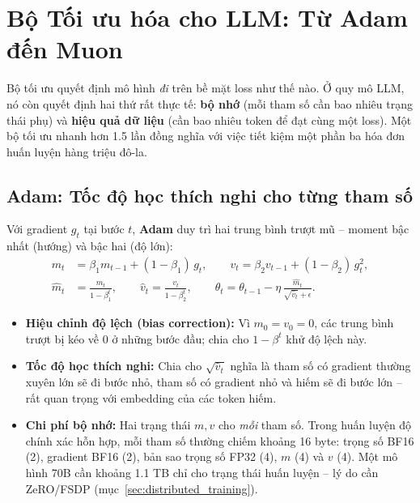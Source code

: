 
\section{Bộ Tối ưu hóa cho LLM: Từ Adam đến Muon \newtag}
\label{sec:llm_optimizers}

Bộ tối ưu quyết định mô hình \emph{đi} trên bề mặt loss như thế nào. Ở quy mô LLM, nó còn quyết định hai thứ rất thực tế: \textbf{bộ nhớ} (mỗi tham số cần bao nhiêu trạng thái phụ) và \textbf{hiệu quả dữ liệu} (cần bao nhiêu token để đạt cùng một loss). Một bộ tối ưu nhanh hơn 1.5 lần đồng nghĩa với việc tiết kiệm một phần ba hóa đơn huấn luyện hàng triệu đô-la.

\subsection{Adam: Tốc độ học thích nghi cho từng tham số}
\label{ssec:adam}
Với gradient $g_t$ tại bước $t$, \textbf{Adam} \cite{kingma2014adam} duy trì hai trung bình trượt mũ -- moment bậc nhất (hướng) và bậc hai (độ lớn):
\begin{align}
	m_t &= \beta_1 m_{t-1} + (1-\beta_1)\, g_t, \qquad
	v_t = \beta_2 v_{t-1} + (1-\beta_2)\, g_t^2, \\
	\hat{m}_t &= \frac{m_t}{1-\beta_1^t}, \qquad \hat{v}_t = \frac{v_t}{1-\beta_2^t}, \qquad
	\theta_t = \theta_{t-1} - \eta\, \frac{\hat{m}_t}{\sqrt{\hat{v}_t} + \epsilon}.
\end{align}
\begin{itemize}
	\item \textbf{Hiệu chỉnh độ lệch (bias correction):} Vì $m_0 = v_0 = 0$, các trung bình trượt bị kéo về 0 ở những bước đầu; chia cho $1-\beta^t$ khử độ lệch này.
	\item \textbf{Tốc độ học thích nghi:} Chia cho $\sqrt{\hat{v}_t}$ nghĩa là tham số có gradient thường xuyên lớn sẽ đi bước nhỏ, tham số có gradient nhỏ và hiếm sẽ đi bước lớn -- rất quan trọng với embedding của các token hiếm.
	\item \textbf{Chi phí bộ nhớ:} Hai trạng thái $m, v$ cho \emph{mỗi} tham số. Trong huấn luyện độ chính xác hỗn hợp, mỗi tham số thường chiếm khoảng 16 byte: trọng số BF16 (2), gradient BF16 (2), bản sao trọng số FP32 (4), $m$ (4) và $v$ (4). Một mô hình 70B cần khoảng 1.1 TB chỉ cho trạng thái huấn luyện -- lý do cần ZeRO/FSDP (mục~\ref{sec:distributed_training}).
\end{itemize}

